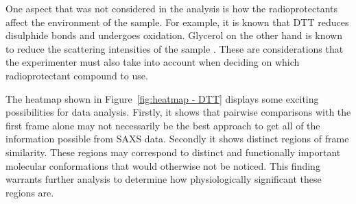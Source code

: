 One aspect that was not considered in the analysis is how the radioprotectants affect the environment of the sample.
For example, it is known that DTT reduces disulphide bonds and undergoes oxidation.
Glycerol on the other hand is known to reduce the scattering intensities of the sample \cite{jeffries2015limiting}.
These are considerations that the experimenter must also take into account when deciding on which radioprotectant compound to use.

The heatmap shown in Figure~\ref{fig:heatmap - DTT} displays some exciting possibilities for data analysis.
Firstly, it shows that pairwise comparisons with the first frame alone may not necessarily be the best approach to get all of the information possible from SAXS data.
Secondly it shows distinct regions of frame similarity.
These regions may correspond to distinct and functionally important molecular conformations that would otherwise not be noticed.
This finding warrants further analysis to determine how physiologically significant these regions are.
